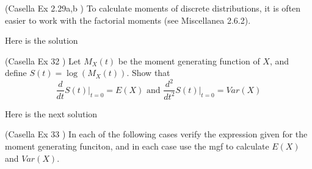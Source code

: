 \documentclass[12pt,letterpaper]{exam}
\begin{document}
\begin{questions}
	\setcounter{question}{28}
	\question (Casella Ex 2.29a,b ) To calculate moments of discrete distributions, it is often easier to work with the factorial moments (see Miscellanea 2.6.2). 
	
	\begin{solution}
		Here is the solution
	\end{solution}
	
	\setcounter{question}{31}
	\question  (Casella Ex 32 ) Let $M_X(t)$ be the moment generating function of $X$, and define $S(t) = \log{(M_X(t))}$. Show that
	$$ \frac{d}{dt} \left. S(t) \right|_{t=0} = E(X) \text{ and }  \frac{d^2}{dt^2} \left. S(t) \right|_{t=0} = Var(X)$$
	\begin{solution}
		Here is the next solution
	\end{solution}
	
	\question  (Casella Ex 33 ) In each of the following cases verify the expression given for the moment generating funciton, and in each case use the mgf to calculate $E(X)$ and $Var(X)$.
	

\end{questions}
\end{document}
